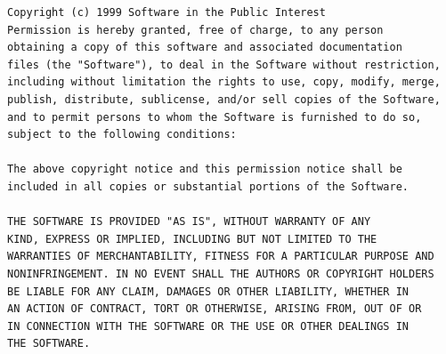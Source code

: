 \documentclass[mingoth,a4paper]{jsarticle}
\begin{document}
{{\begin{multicols}{2}
\begin{fontsize}{6}{6}
\begin{verbatim}
Copyright (c) 1999 Software in the Public Interest
Permission is hereby granted, free of charge, to any person
obtaining a copy of this software and associated documentation
files (the "Software"), to deal in the Software without restriction,
including without limitation the rights to use, copy, modify, merge,
publish, distribute, sublicense, and/or sell copies of the Software,
and to permit persons to whom the Software is furnished to do so,
subject to the following conditions:

The above copyright notice and this permission notice shall be
included in all copies or substantial portions of the Software.

THE SOFTWARE IS PROVIDED "AS IS", WITHOUT WARRANTY OF ANY
KIND, EXPRESS OR IMPLIED, INCLUDING BUT NOT LIMITED TO THE
WARRANTIES OF MERCHANTABILITY, FITNESS FOR A PARTICULAR PURPOSE AND
NONINFRINGEMENT. IN NO EVENT SHALL THE AUTHORS OR COPYRIGHT HOLDERS
BE LIABLE FOR ANY CLAIM, DAMAGES OR OTHER LIABILITY, WHETHER IN
AN ACTION OF CONTRACT, TORT OR OTHERWISE, ARISING FROM, OUT OF OR
IN CONNECTION WITH THE SOFTWARE OR THE USE OR OTHER DEALINGS IN
THE SOFTWARE.
 \end{verbatim}
 \end{fontsize}
\end{multicols}


}}
\end{document}
